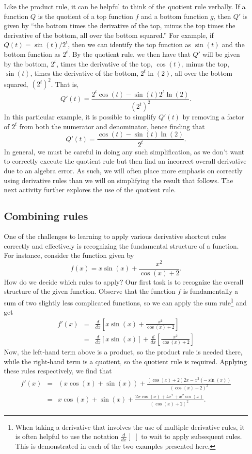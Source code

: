 Like the product rule, it can be helpful to think of the quotient rule verbally.  If a function $Q$ is the quotient of a top function $f$ and a bottom function $g$, then $Q'$ is given by ``the bottom times the derivative of the top, minus the top times the derivative of the bottom, all over the bottom squared.''   For example, if $Q(t) = \sin(t)/2^t$, then we can identify the top function as $\sin(t)$ and the bottom function as $2^t$.  By the quotient rule, we then have that $Q'$ will be given by the bottom, $2^t$, times the derivative of the top, $\cos(t)$, minus the top, $\sin(t)$, times the derivative of the bottom, $2^t \ln(2)$, all over the bottom squared, $(2^t)^2$.  That is,
$$Q'(t) = \frac{2^t \cos(t) - \sin(t) 2^t \ln(2)}{(2^t)^2}.$$
In this particular example, it is possible to simplify $Q'(t)$ by removing a factor of $2^t$ from both the numerator and denominator, hence finding that
$$Q'(t) = \frac{\cos(t) - \sin(t) \ln(2)}{2^t}.$$
In general, we must be careful in doing any such simplification, as we don't want to correctly execute the quotient rule but then find an incorrect overall derivative due to an algebra error.  As such, we will often place more emphasis on correctly using derivative rules than we will on simplifying the result that follows.  The next activity further explores the use of the quotient rule.



\subsection*{Combining rules}

One of the challenges to learning to apply various derivative shortcut rules correctly and effectively is recognizing the fundamental structure of a function.  For instance, consider the function given by
$$f(x) = x\sin(x) + \frac{x^2}{\cos(x) + 2}.$$
How do we decide which rules to apply?  Our first task is to recognize the overall structure of the given function.  Observe that the function $f$ is fundamentally a sum of two slightly less complicated functions, so we can apply the sum rule\footnote{When taking a derivative that involves the use of multiple derivative rules, it is often helpful to use the notation $\frac{d}{dx} \left[ ~~\right]$ to wait to apply subsequent rules.  This is demonstrated in each of the two examples presented here.} and get
\begin{eqnarray*}
f'(x) & = & \frac{d}{dx} \left[ x\sin(x) + \frac{x^2}{\cos(x) + 2} \right] \\
	& = & \frac{d}{dx} \left[ x\sin(x) \right] + \frac{d}{dx}\left[ \frac{x^2}{\cos(x) + 2} \right]  
\end{eqnarray*}
Now, the left-hand term above is a product, so the product rule is needed there, while the right-hand term is a quotient, so the quotient rule is required.  Applying these rules respectively, we find that
\begin{eqnarray*}
 f'(x) & = & \left( x \cos(x) + \sin(x) \right) + \frac{(\cos(x) + 2) 2x - x^2(-\sin(x))}{(\cos(x) + 2)^2} \\
        & = & x \cos(x) + \sin(x) + \frac{2x\cos(x) + 4x^2 + x^2\sin(x)}{(\cos(x) + 2)^2}.
\end{eqnarray*}

